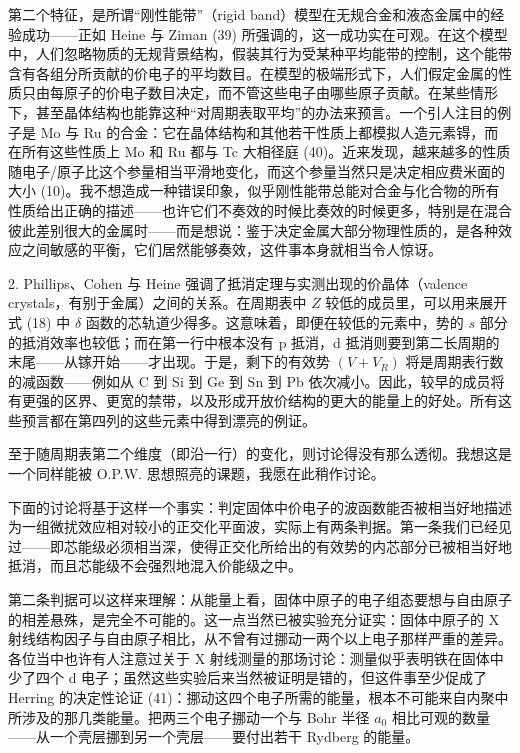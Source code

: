 第二个特征，是所谓“刚性能带”（rigid band）模型在无规合金和液态金属中的经验成功——正如 Heine 与 Ziman (39) 所强调的，这一成功实在可观。在这个模型中，人们忽略物质的无规背景结构，假装其行为受某种平均能带的控制，这个能带含有各组分所贡献的价电子的平均数目。在模型的极端形式下，人们假定金属的性质只由每原子的价电子数目决定，而不管这些电子由哪些原子贡献。在某些情形下，甚至晶体结构也能靠这种“对周期表取平均”的办法来预言。一个引人注目的例子是 Mo 与 Ru 的合金：它在晶体结构和其他若干性质上都模拟人造元素锝，而在所有这些性质上 Mo 和 Ru 都与 Tc 大相径庭 (40)。近来发现，越来越多的性质随电子/原子比这个参量相当平滑地变化，而这个参量当然只是决定相应费米面的大小 (10)。我不想造成一种错误印象，似乎刚性能带总能对合金与化合物的所有性质给出正确的描述——也许它们不奏效的时候比奏效的时候更多，特别是在混合彼此差别很大的金属时——而是想说：鉴于决定金属大部分物理性质的，是各种效应之间敏感的平衡，它们居然能够奏效，这件事本身就相当令人惊讶。

2. Phillips、Cohen 与 Heine 强调了抵消定理与实测出现的价晶体（valence crystals，有别于金属）之间的关系。在周期表中 $Z$ 较低的成员里，可以用来展开式 (18) 中 $\delta$ 函数的芯轨道少得多。这意味着，即便在较低的元素中，势的 $s$ 部分的抵消效率也较低；而在第一行中根本没有 p 抵消，d 抵消则要到第二长周期的末尾——从镓开始——才出现。于是，剩下的有效势 $(V + V_R)$ 将是周期表行数的减函数——例如从 C 到 Si 到 Ge 到 Sn 到 Pb 依次减小。因此，较早的成员将有更强的区界、更宽的禁带，以及形成开放价结构的更大的能量上的好处。所有这些预言都在第四列的这些元素中得到漂亮的例证。

至于随周期表第二个维度（即沿一行）的变化，则讨论得没有那么透彻。我想这是一个同样能被 O.P.W. 思想照亮的课题，我愿在此稍作讨论。

下面的讨论将基于这样一个事实：判定固体中价电子的波函数能否被相当好地描述为一组微扰效应相对较小的正交化平面波，实际上有两条判据。第一条我们已经见过——即芯能级必须相当深，使得正交化所给出的有效势的内芯部分已被相当好地抵消，而且芯能级不会强烈地混入价能级之中。

第二条判据可以这样来理解：从能量上看，固体中原子的电子组态要想与自由原子的相差悬殊，是完全不可能的。这一点当然已被实验充分证实：固体中原子的 X 射线结构因子与自由原子相比，从不曾有过挪动一两个以上电子那样严重的差异。各位当中也许有人注意过关于 X 射线测量的那场讨论：测量似乎表明铁在固体中少了四个 d 电子；虽然这些实验后来当然被证明是错的，但这件事至少促成了 Herring 的决定性论证 (41)：挪动这四个电子所需的能量，根本不可能来自内聚中所涉及的那几类能量。把两三个电子挪动一个与 Bohr 半径 $a_0$ 相比可观的数量——从一个壳层挪到另一个壳层——要付出若干 Rydberg 的能量。

